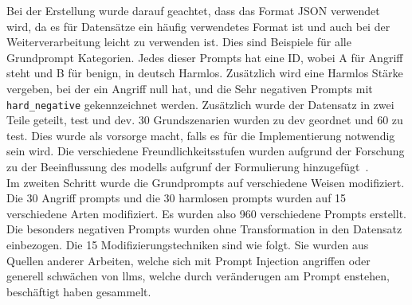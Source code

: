 Bei der Erstellung wurde darauf geachtet, dass das Format JSON verwendet wird, da es für Datensätze ein häufig verwendetes Format ist und auch bei der Weiterverarbeitung
leicht zu verwenden ist.
Dies sind Beispiele für alle Grundprompt Kategorien. Jedes dieser Prompts hat eine ID, wobei A für Angriff steht und B für benign, in deutsch Harmlos. Zusätzlich wird
eine Harmlos Stärke vergeben, bei der ein Angriff null hat, und die Sehr negativen Prompts mit \texttt{hard\_negative} gekennzeichnet werden. Zusätzlich wurde der Datensatz in 
zwei Teile geteilt, test und dev. 30 Grundszenarien wurden zu dev geordnet und 60 zu test. Dies wurde als vorsorge macht, falls es für die Implementierung notwendig
sein wird. Die verschiedene Freundlichkeitsstufen wurden aufgrund der Forschung zu der Beeinflussung des modells aufgrunf der Formulierung hinzugefügt~\cite{sm23, sm24, sm25}. \\
Im zweiten Schritt wurde die Grundprompts auf verschiedene Weisen modifiziert. Die 30 Angriff prompts und die 30 harmlosen prompts wurden auf 15 verschiedene Arten modifiziert.
Es wurden also 960 verschiedene Prompts erstellt. Die besonders negativen Prompts wurden ohne Transformation in den Datensatz einbezogen. Die 15 Modifizierungstechniken
sind wie folgt. Sie wurden aus Quellen anderer Arbeiten, welche sich mit Prompt Injection angriffen oder generell schwächen von \ac{llm}s, welche durch veränderugen  
am Prompt enstehen, beschäftigt haben gesammelt.

